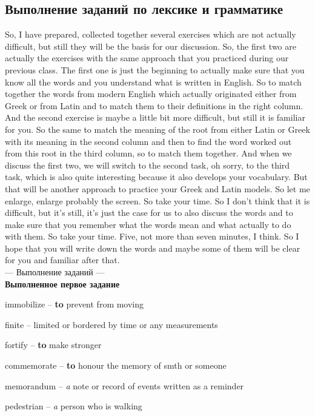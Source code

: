 \documentclass[main.tex]{subfiles}
\begin{document}
\subsection{Выполнение заданий по лексике и грамматике}

So, I have prepared, collected together several exercises which are not actually difficult, but still they will be the basis for our discussion.
So, the first two are actually the exercises with the same approach that you practiced during our previous class.
The first one is just the beginning to actually make sure that you know all the words and you understand what is written in English.
So to match together the words from modern English which actually originated either from Greek or from Latin and to match them to their definitions in the right column.
And the second exercise is maybe a little bit more difficult, but still it is familiar for you.
So the same to match the meaning of the root from either Latin or Greek with its meaning in the second column and then to find the word worked out from this root in the third column, so to match them together.
And when we discuss the first two, we will switch to the second task, oh sorry, to the third task, which is also quite interesting because it also develops your vocabulary.
But that will be another approach to practice your Greek and Latin models.
So let me enlarge, enlarge probably the screen.
So take your time.
So I don't think that it is difficult, but it's still, it's just the case for us to also discuss the words and to make sure that you remember what the words mean and what actually to do with them.
So take your time.
Five, not more than seven minutes, I think.
So I hope that you will write down the words and maybe some of them will be clear for you and familiar after that.
\\

--- Выполнение заданий ---
\\

\textbf{Выполненное первое задание}

immobilize -- \textbf{to} prevent from moving

finite -- limited or bordered by time or any measurements

fortify -- \textbf{to} make stronger

commemorate -- \textbf{to} honour the memory of smth or someone

memorandum -- \textit{a} note or record of events written as a reminder

pedestrian -- \textit{a} person who is walking
\end{document}
